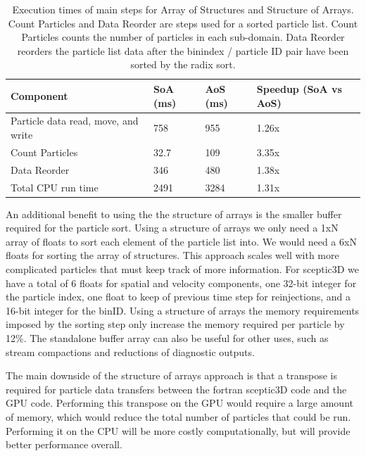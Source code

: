 \noindent \begin{table}[h]
\begin{tabular}{| p{4.0cm} | p{3.5cm} | p{2.5cm} | p{4.0cm} |}
\hline
Component & SoA (ms) & AoS (ms) & Speedup (SoA vs AoS) \\ \hline
Particle data read, move, and write & 758 & 955 & 1.26x \\ \hline
Count Particles & 32.7 & 109 & 3.35x \\ \hline
Data Reorder & 346 & 480 & 1.38x \\ \hline
Total CPU run time & 2491 & 3284 & 1.31x \\ \hline
\end{tabular}
\caption{Execution times of main steps for Array of Structures and Structure of Arrays. Count Particles and Data Reorder are steps used for a sorted particle list. Count Particles counts the number of particles in each sub-domain. Data Reorder reorders the particle list data after the binindex / particle ID pair have been sorted by the radix sort.}
\label{tab:struct_compare} 
\end{table}

An additional benefit to using the the structure of arrays is the smaller buffer required for the particle sort. Using a structure of arrays we only need a 1xN array of floats to sort each element of the particle list into. We would need a 6xN floats for sorting the array of structures. This approach scales well with more complicated particles that must keep track of more information. For sceptic3D we have a total of 6 floats for spatial and velocity components, one 32-bit integer for the particle index, one float to keep of previous time step for reinjections, and a 16-bit integer for the binID. Using a structure of arrays the memory requirements imposed by the sorting step only increase the memory required per particle by 12\%. The standalone buffer array can also be useful for other uses, such as stream compactions and reductions of diagnostic outputs. 

The main downside of the structure of arrays approach is that a transpose is required for particle data transfers between the fortran sceptic3D code and the GPU code. Performing this transpose on the GPU would require a large amount of memory, which would reduce the total number of particles that could be run. Performing it on the CPU will be more costly computationally, but will provide better performance overall.  




